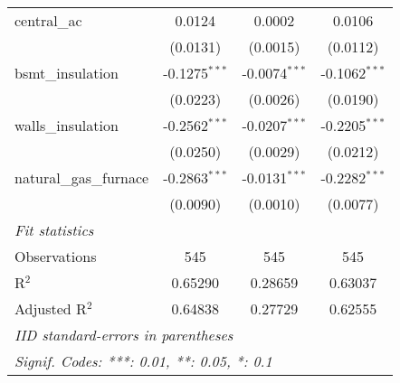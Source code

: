 \begin{tabular}{lccc}
   central\_ac             & 0.0124                                                                   & 0.0002                                                                      & 0.0106\\   
                           & (0.0131)                                                                 & (0.0015)                                                                    & (0.0112)\\   
   bsmt\_insulation        & -0.1275$^{***}$                                                          & -0.0074$^{***}$                                                             & -0.1062$^{***}$\\   
                           & (0.0223)                                                                 & (0.0026)                                                                    & (0.0190)\\   
   walls\_insulation       & -0.2562$^{***}$                                                          & -0.0207$^{***}$                                                             & -0.2205$^{***}$\\   
                           & (0.0250)                                                                 & (0.0029)                                                                    & (0.0212)\\   
   natural\_gas\_furnace   & -0.2863$^{***}$                                                          & -0.0131$^{***}$                                                             & -0.2282$^{***}$\\   
                           & (0.0090)                                                                 & (0.0010)                                                                    & (0.0077)\\   
   \midrule
   \emph{Fit statistics}\\
   Observations            & 545                                                                      & 545                                                                         & 545\\  
   R$^2$                   & 0.65290                                                                  & 0.28659                                                                     & 0.63037\\  
   Adjusted R$^2$          & 0.64838                                                                  & 0.27729                                                                     & 0.62555\\  
   \midrule \midrule
   \multicolumn{4}{l}{\emph{IID standard-errors in parentheses}}\\
   \multicolumn{4}{l}{\emph{Signif. Codes: ***: 0.01, **: 0.05, *: 0.1}}\\
\end{tabular}
\par\endgroup


